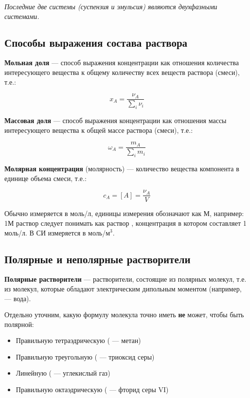 \textit{Последние две системы (суспензия и эмульсия) являются двухфазными системами.}

\subsection{Способы выражения состава раствора}

\textbf{Мольная доля} --- способ выражения концентрации как отношения количества интересующего вещества к общему количеству всех веществ раствора (смеси), т.е.:

\begin{equation}
	x_A = \frac{\nu_A}{\sum\limits_i \nu_i}
\end{equation}

\textbf{Массовая доля} --- способ выражения концентрации как отношения массы интересующего вещества к общей массе раствора (смеси), т.е.:

\begin{equation}
	\omega_A = \frac{m_A}{\sum\limits_i m_i}
\end{equation}

\textbf{Молярная концентрация} (молярность) --- количество вещества компонента в единице объема смеси, т.е.:

\begin{equation}
	c_A = [A] = \frac{\nu_A}{V}
\end{equation}

Обычно измеряется в моль/л, единицы измерения обозначают как М, например: 1М раствор  следует понимать как раствор , концентрация  в котором составляет 1 моль/л. В СИ измеряется в моль/м$^3$.

\subsection{Полярные и неполярные растворители}

\textbf{Полярные растворители} --- растворители, состоящие из полярных молекул, т.е. из молекул, которые обладают электрическим дипольным моментом (например,  --- вода).

Отдельно уточним, какую формулу молекула точно иметь \textbf{не} может, чтобы быть полярной: 

\begin{itemize}
	\item Правильную тетраэдрическую ( --- метан)
	
	\item Правильную треугольную ( --- триоксид серы)
	
	\item Линейную ( --- углекислый газ)
	
	\item Правильную октаэдрическую ( --- фторид серы \RN{6})
\end{itemize}


